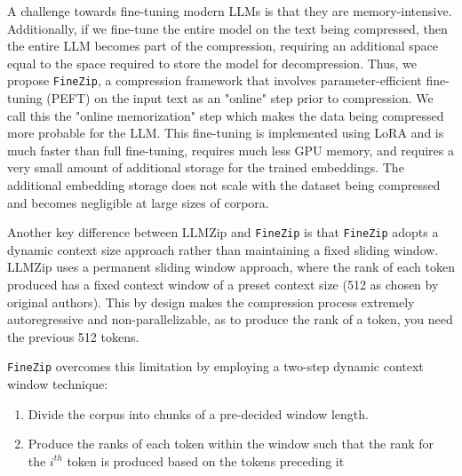\documentclass[11pt]{article}
\begin{document}
A challenge towards fine-tuning modern LLMs is that they are memory-intensive. Additionally, if we fine-tune the entire model on the text being compressed, then the entire LLM becomes part of the compression, requiring an additional space equal to the space required to store the model for decompression. Thus, we propose \texttt{FineZip}, a compression framework that involves parameter-efficient fine-tuning (PEFT) \citep{peft} on the input text as an "online" step prior to compression. We call this the "online memorization" step which makes the data being compressed more probable for the LLM. This fine-tuning is implemented using LoRA \cite{hu2021lora} and is much faster than full fine-tuning, requires much less GPU memory, and requires a very small amount of additional storage for the trained embeddings. The additional embedding storage does not scale with the dataset being compressed and becomes negligible at large sizes of corpora. 





Another key difference between LLMZip and \texttt{FineZip} is that \texttt{FineZip} adopts a dynamic context size approach rather than maintaining a fixed sliding window. LLMZip uses a permanent sliding window approach, where the rank of each token produced has a fixed context window of a preset context size (512 as chosen by original authors). This by design makes the compression process extremely autoregressive and non-parallelizable, as to produce the rank of a token, you need the previous 512 tokens. 

\vspace{0.2cm}

\noindent \texttt{FineZip} overcomes this limitation by employing a two-step dynamic context window technique:
\begin{enumerate}
    \item Divide the corpus into chunks of a pre-decided window length.
    \item Produce the ranks of each token within the window such that the rank for the $i^{th}$ token is produced based on the tokens preceding it
\end{enumerate}
\end{document}
